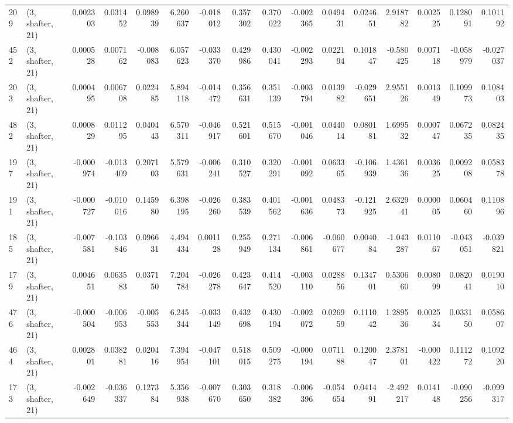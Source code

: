 \begin{tabular}{llrrrrrrrrrrrrrr}
209 &  (3, shafter, 21) &   0.002303 &  0.031452 &  0.098939 &    6.260637 & -0.018012 &   0.357302 &  0.370022 & -0.002365 &  0.049431 &  0.024651 &    2.918782 &  0.002525 &  0.128091 &  0.101192 \\
452 &  (3, shafter, 21) &   0.000528 &  0.007162 & -0.008083 &    6.057623 & -0.033370 &   0.429986 &  0.430041 & -0.002293 &  0.022194 &  0.101847 &   -0.580425 &  0.007118 & -0.058979 & -0.027037 \\
203 &  (3, shafter, 21) &   0.000495 &  0.006708 &  0.022485 &    5.894118 & -0.014472 &   0.356631 &  0.351139 & -0.003794 &  0.013982 & -0.029651 &    2.955126 &  0.001349 &  0.109973 &  0.108403 \\
482 &  (3, shafter, 21) &   0.000829 &  0.011295 &  0.040443 &    6.570311 & -0.046917 &   0.521601 &  0.515670 & -0.001046 &  0.044014 &  0.080181 &    1.699532 &  0.000747 &  0.067235 &  0.082435 \\
197 &  (3, shafter, 21) &  -0.000974 & -0.013409 &  0.207103 &    5.579631 & -0.006241 &   0.310527 &  0.320291 & -0.001092 &  0.063365 & -0.106939 &    1.436136 &  0.003625 &  0.009208 &  0.058378 \\
191 &  (3, shafter, 21) &  -0.000727 & -0.010016 &  0.145980 &    6.398195 & -0.026260 &   0.383539 &  0.401562 & -0.001636 &  0.048373 & -0.121925 &    2.632941 &  0.000005 &  0.060460 &  0.110896 \\
185 &  (3, shafter, 21) &  -0.007581 & -0.103846 &  0.096631 &    4.494434 &  0.001128 &   0.255949 &  0.271134 & -0.006861 & -0.060677 &  0.004084 &   -1.043287 &  0.011067 & -0.043051 & -0.039821 \\
179 &  (3, shafter, 21) &   0.004651 &  0.063583 &  0.037150 &    7.204784 & -0.026278 &   0.423647 &  0.414520 & -0.003110 &  0.028856 &  0.134701 &    0.530660 &  0.008099 &  0.082041 &  0.019010 \\
476 &  (3, shafter, 21) &  -0.000504 & -0.006953 & -0.005553 &    6.245344 & -0.033149 &   0.432698 &  0.430194 & -0.002072 &  0.026959 &  0.111042 &    1.289536 &  0.002534 &  0.033150 &  0.058607 \\
464 &  (3, shafter, 21) &   0.002801 &  0.038281 &  0.020416 &    7.394954 & -0.047101 &   0.518015 &  0.509275 & -0.000194 &  0.071188 &  0.120047 &    2.378101 & -0.000422 &  0.111272 &  0.109220 \\
173 &  (3, shafter, 21) &  -0.002649 & -0.036337 &  0.127384 &    5.356938 & -0.007670 &   0.303650 &  0.318382 & -0.006396 & -0.054654 &  0.041491 &   -2.492217 &  0.014148 & -0.090256 & -0.099317 \\

\end{tabular}

